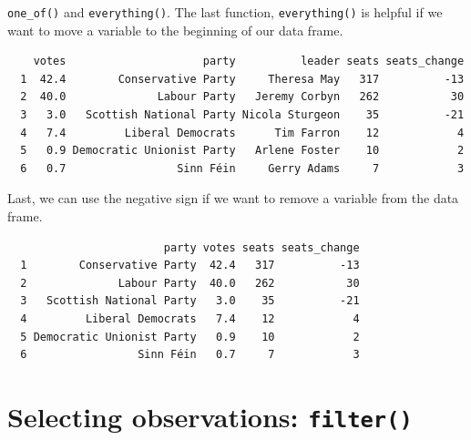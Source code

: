 \documentclass[12pt,oneside]{reedthesis}
\theoremstyle{definition}
\theoremstyle{definition}
\theoremstyle{definition}
\theoremstyle{remark}
\begin{document}
  \texttt{one\_of()} and \texttt{everything()}. The last function,
  \texttt{everything()} is helpful if we want to move a variable to the
  beginning of our data frame.
  \begin{Shaded}
  \begin{Highlighting}[]
  \NormalTok{())}
  \end{Highlighting}
  \end{Shaded}
  \begin{verbatim}
    votes                     party          leader seats seats_change
  1  42.4        Conservative Party     Theresa May   317          -13
  2  40.0              Labour Party   Jeremy Corbyn   262           30
  3   3.0   Scottish National Party Nicola Sturgeon    35          -21
  4   7.4         Liberal Democrats      Tim Farron    12            4
  5   0.9 Democratic Unionist Party   Arlene Foster    10            2
  6   0.7                 Sinn Féin     Gerry Adams     7            3
  \end{verbatim}
  Last, we can use the negative sign if we want to remove a variable from
  the data frame.
  \begin{Shaded}
  \begin{Highlighting}[]
  \OperatorTok{-}
  \end{Highlighting}
  \end{Shaded}
  \begin{verbatim}
                        party votes seats seats_change
  1        Conservative Party  42.4   317          -13
  2              Labour Party  40.0   262           30
  3   Scottish National Party   3.0    35          -21
  4         Liberal Democrats   7.4    12            4
  5 Democratic Unionist Party   0.9    10            2
  6                 Sinn Féin   0.7     7            3
  \end{verbatim}
  \section{\texorpdfstring{Selecting observations:
  \texttt{filter()}}{Selecting observations: filter()}}\label{selecting-observations-filter}
  
\end{document}
